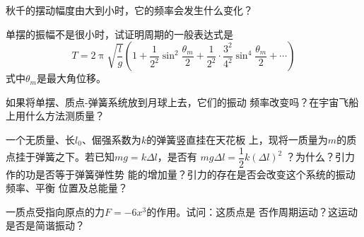 \begin{questions}
\question 秋千的摆动幅度由大到小时，它的频率会发生什么变化？

\question 单摆的振幅不是很小时，试证明周期的一般表达式是
{\setlength{\mathindent}{4em}
\begin{equation*}
 T = 2 \uppi \sqrt { \frac { l } { g } } \left( 1 + \frac { 1 } { 2 ^ { 2 } } \sin ^ { 2 } \frac { \theta _ { m } } { 2 } + \frac { 1 } { 2 ^ { 2 } } \cdot \frac { 3 ^ { 2 } } { 4 ^ { 2 } } \sin ^ { 4 } \frac { \theta _ { m } } { 2 } + \cdots \right)
\end{equation*}}
式中$ \theta _ { m } $是最大角位移。

\question 如果将单摆、质点-弹簧系统放到月球上去，它们的振动
频率改变吗？在宇宙飞船上用什么方法测质量？

\question 一个无质量、长$ l _ { 0 } $、倔强系数为$ k $的弹簧竖直挂在天花板
上，现将一质量为$ m $的质点挂于弹簧之下。若已知$ m g = k \Delta l $，是否有
$ m g \Delta l = \dfrac { 1 } { 2 } k \left( \Delta l \right) ^ { 2 } $
？为什么？引力作的功是否等于弹簧弹性势
能的增加量？引力的存在是否会改变这个系统的振动频率、平衡
位置及总能量？

\question 一质点受指向原点的力$ F = - 6 x ^ { 3 } $的作用。试问：这质点是
否作周期运动？这运动是否是简谐振动？

\end{questions}